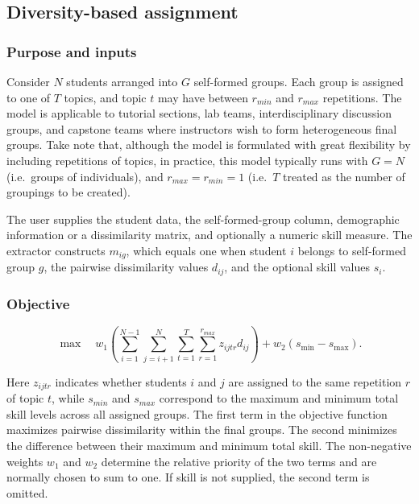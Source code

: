 \subsection{Diversity-based assignment}\label{diversity-based-assignment}

\subsubsection{Purpose and inputs}\label{purpose-and-inputs}

Consider \(N\) students arranged into \(G\) self-formed groups. Each group is
assigned to one of \(T\) topics, and topic \(t\) may have between \(r_{min}\) and
\(r_{max}\) repetitions. The model is applicable to tutorial sections, lab
teams, interdisciplinary discussion groups, and capstone teams where
instructors wish to form heterogeneous final groups. Take note that, although
the model is formulated with great flexibility by including repetitions of
topics, in practice, this model typically runs with \(G=N\) (i.e.~groups of
individuals), and \(r_{max} = r_{min} = 1\) (i.e.~\(T\) treated as the number of
groupings to be created).

The user supplies the student data, the self-formed-group column, demographic
information or a dissimilarity matrix, and optionally a numeric skill measure.
The extractor constructs \(m_{ig}\), which equals one when student \(i\) belongs
to self-formed group \(g\), the pairwise dissimilarity values \(d_{ij}\), and
the optional skill values \(s_i\).

\subsubsection{Objective}\label{objective}

\[
\max \quad w_1 \left(
\sum_{i=1}^{N-1}\sum_{j=i+1}^{N}\sum_{t=1}^{T}
\sum_{r=1}^{r_{max}}z_{ijtr}d_{ij}\right)
+w_2(s_{\min}-s_{\max}).
\]

Here \(z_{ijtr}\) indicates whether students \(i\) and \(j\) are assigned to
the same repetition \(r\) of topic \(t\), while \(s_{min}\) and \(s_{max}\)
correspond to the maximum and minimum total skill levels across all assigned
groups. The first term in the objective function maximizes pairwise
dissimilarity within the final groups. The second minimizes the difference
between their maximum and minimum total skill. The non-negative weights \(w_1\)
and \(w_2\) determine the relative priority of the two terms and are normally
chosen to sum to one. If skill is not supplied, the second term is omitted.

